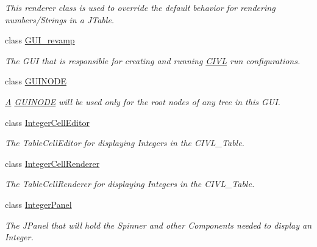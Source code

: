 \begin{DoxyCompactItemize}
\begin{DoxyCompactList}\small\item\em This renderer class is used to override the default behavior for rendering numbers/\+Strings in a J\+Table. \end{DoxyCompactList}\item 
class \hyperlink{classedu_1_1udel_1_1cis_1_1vsl_1_1civl_1_1gui_1_1common_1_1GUI__revamp}{G\+U\+I\+\_\+revamp}
\begin{DoxyCompactList}\small\item\em The G\+U\+I that is responsible for creating and running \hyperlink{classedu_1_1udel_1_1cis_1_1vsl_1_1civl_1_1CIVL}{C\+I\+V\+L} run configurations. \end{DoxyCompactList}\item 
class \hyperlink{classedu_1_1udel_1_1cis_1_1vsl_1_1civl_1_1gui_1_1common_1_1GUINODE}{G\+U\+I\+N\+O\+D\+E}
\begin{DoxyCompactList}\small\item\em \hyperlink{structA}{A} \hyperlink{classedu_1_1udel_1_1cis_1_1vsl_1_1civl_1_1gui_1_1common_1_1GUINODE}{G\+U\+I\+N\+O\+D\+E} will be used only for the root nodes of any tree in this G\+U\+I. \end{DoxyCompactList}\item 
class \hyperlink{classedu_1_1udel_1_1cis_1_1vsl_1_1civl_1_1gui_1_1common_1_1IntegerCellEditor}{Integer\+Cell\+Editor}
\begin{DoxyCompactList}\small\item\em The Table\+Cell\+Editor for displaying Integers in the C\+I\+V\+L\+\_\+\+Table. \end{DoxyCompactList}\item 
class \hyperlink{classedu_1_1udel_1_1cis_1_1vsl_1_1civl_1_1gui_1_1common_1_1IntegerCellRenderer}{Integer\+Cell\+Renderer}
\begin{DoxyCompactList}\small\item\em The Table\+Cell\+Renderer for displaying Integers in the C\+I\+V\+L\+\_\+\+Table. \end{DoxyCompactList}\item 
class \hyperlink{classedu_1_1udel_1_1cis_1_1vsl_1_1civl_1_1gui_1_1common_1_1IntegerPanel}{Integer\+Panel}
\begin{DoxyCompactList}\small\item\em The J\+Panel that will hold the Spinner and other Components needed to display an Integer. \end{DoxyCompactList}\item 

\end{DoxyCompactItemize}
